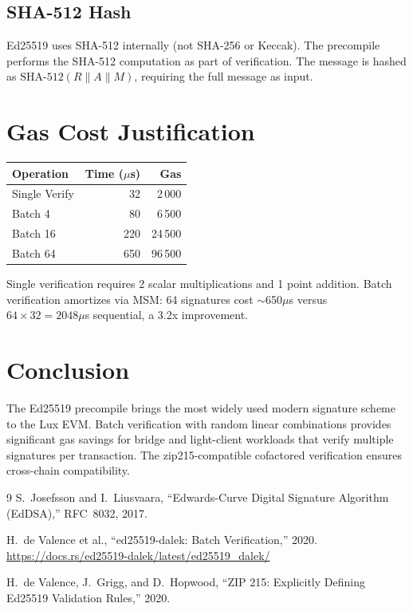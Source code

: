 \documentclass[11pt,a4paper]{article}
\begin{document}
\subsection{SHA-512 Hash}

Ed25519 uses SHA-512 internally (not SHA-256 or Keccak). The precompile
performs the SHA-512 computation as part of verification. The message is
hashed as $\text{SHA-512}(R \| A \| M)$, requiring the full message as input.

\section{Gas Cost Justification}

\begin{table}[H]
\centering
\begin{tabular}{lrr}
\toprule
\textbf{Operation} & \textbf{Time ($\mu$s)} & \textbf{Gas} \\
\midrule
Single Verify & 32 & 2\,000 \\
Batch 4 & 80 & 6\,500 \\
Batch 16 & 220 & 24\,500 \\
Batch 64 & 650 & 96\,500 \\
\bottomrule
\end{tabular}
\end{table}

Single verification requires 2 scalar multiplications and 1 point addition.
Batch verification amortizes via MSM: 64 signatures cost $\sim$650$\mu$s
versus $64 \times 32 = 2048\mu$s sequential, a 3.2x improvement.

\section{Conclusion}

The Ed25519 precompile brings the most widely used modern signature scheme to
the Lux EVM. Batch verification with random linear combinations provides
significant gas savings for bridge and light-client workloads that verify
multiple signatures per transaction. The zip215-compatible cofactored
verification ensures cross-chain compatibility.

\begin{thebibliography}{9}
  S.~Josefsson and I.~Liusvaara, ``Edwards-Curve Digital Signature Algorithm
  (EdDSA),'' RFC~8032, 2017.

  H.~de Valence et al., ``ed25519-dalek: Batch Verification,'' 2020.
  \url{https://docs.rs/ed25519-dalek/latest/ed25519_dalek/}

  H.~de Valence, J.~Grigg, and D.~Hopwood, ``ZIP 215: Explicitly Defining
  Ed25519 Validation Rules,'' 2020.
\end{thebibliography}
\end{document}
